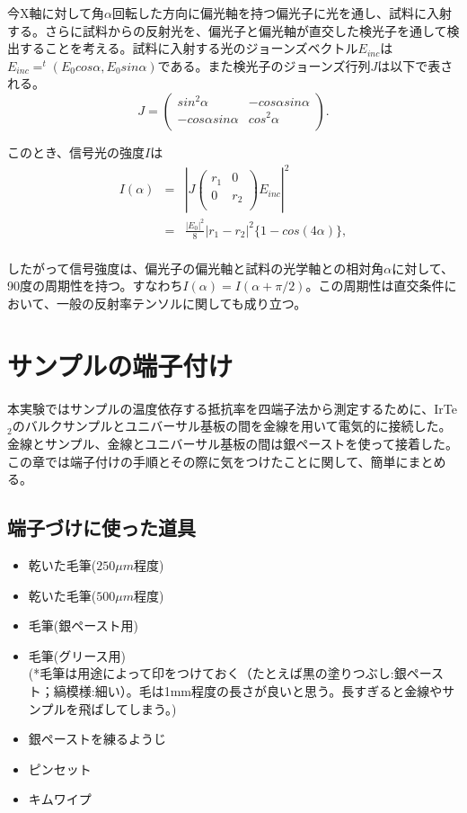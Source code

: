 \documentclass[11pt,a4paper]{jsarticle}
\begin{document}
今X軸に対して角$\alpha$回転した方向に偏光軸を持つ偏光子に光を通し、試料に入射する。さらに試料からの反射光を、偏光子と偏光軸が直交した検光子を通して検出することを考える。試料に入射する光のジョーンズベクトル$E_{inc}$は$E_{inc}=^t (E_0 cos\alpha, E_0 sin\alpha)$である。また検光子のジョーンズ行列$J$は以下で表される。
\[ J =\left(
    \begin{array}{cc}
      sin^2 \alpha & -cos\alpha sin\alpha  \\
      -cos\alpha sin\alpha & cos^2 \alpha  \\
    \end{array} 
  \right).
\] 

このとき、信号光の強度$I$は
\begin{eqnarray}
I(\alpha) &=& |J
 \left(
    \begin{array}{cc}
      r_1 &0  \\
      0 & r_2  \\
    \end{array} 
  \right)
  E_{inc}|^2\\
 &=& \frac{|E_0|^2}{8}|r_1-r_2|^2 \{1-cos(4\alpha)\},\\
\end{eqnarray}

したがって信号強度は、偏光子の偏光軸と試料の光学軸との相対角$\alpha$に対して、90度の周期性を持つ。すなわち$I(\alpha)=I(\alpha+\pi/2)$。この周期性は直交条件において、一般の反射率テンソルに関しても成り立つ。

\section{サンプルの端子付け}
\label{sec:4terminal}
本実験ではサンプルの温度依存する抵抗率を四端子法から測定するために、IrTe$_2$のバルクサンプルとユニバーサル基板の間を金線を用いて電気的に接続した。金線とサンプル、金線とユニバーサル基板の間は銀ペーストを使って接着した。この章では端子付けの手順とその際に気をつけたことに関して、簡単にまとめる。

\subsection{端子づけに使った道具}

\begin{itemize}
\item 乾いた毛筆($250\mu m$程度)
\item 乾いた毛筆($500\mu m$程度)
\item 毛筆(銀ペースト用)
\item 毛筆(グリース用)\\
(*毛筆は用途によって印をつけておく（たとえば黒の塗りつぶし:銀ペースト；縞模様:細い）。毛は1mm程度の長さが良いと思う。長すぎると金線やサンプルを飛ばしてしまう。)
\item 銀ペーストを練るようじ
\item ピンセット
\item キムワイプ
\end{itemize}
\end{document}
